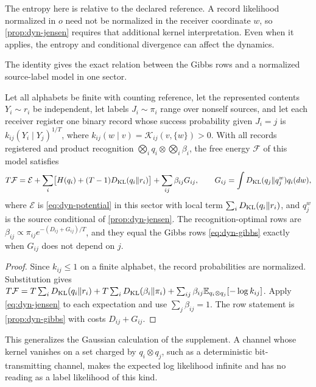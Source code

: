 The entropy here is relative to the declared reference. A record likelihood normalized in $o$ need not be normalized in the receiver coordinate $w$, so \cref{prop:dyn-jensen} requires that additional kernel interpretation. Even when it applies, the entropy and conditional divergence can affect the dynamics.

The identity gives the exact relation between the Gibbs rows and a normalized source-label model in one sector.

Let all alphabets be finite with counting reference, let the represented contents $Y_i\sim r_i$ be independent, let labels $J_i\sim\pi_i$ range over nonself sources, and let each receiver register one binary record whose success probability given $J_i=j$ is $k_{ij}(Y_i\mid Y_j)^{1/T}$, where $k_{ij}(w\mid v)=\mathcal K_{ij}(v,\{w\})>0$. With all records registered and product recognition $\bigotimes_iq_i\otimes\bigotimes_i\beta_i$, the free energy $\mathcal F$ of this model satisfies
\begin{equation}
 T\mathcal F
 =\mathcal E
 +\sum_i\bigl[H(q_i)+(T-1)D_{\mathrm{KL}}(q_i\Vert r_i)\bigr]
 +\sum_{ij}\beta_{ij}G_{ij},
 \qquad
 G_{ij}=\int D_{\mathrm{KL}}(q_j\Vert q_j^w)q_i(dw),
 \label{eq:dyn-label-model}
\end{equation}
where $\mathcal E$ is \cref{eq:dyn-potential} in this sector with local term $\sum_iD_{\mathrm{KL}}(q_i\Vert r_i)$, and $q_j^w$ is the source conditional of \cref{prop:dyn-jensen}. The recognition-optimal rows are $\beta_{ij}\propto\pi_{ij}e^{-(D_{ij}+G_{ij})/T}$, and they equal the Gibbs rows \cref{eq:dyn-gibbs} exactly when $G_{ij}$ does not depend on $j$.
\begin{proof}
Since $k_{ij}\leq1$ on a finite alphabet, the record probabilities are normalized. Substitution gives $T\mathcal F=T\sum_iD_{\mathrm{KL}}(q_i\Vert r_i)+T\sum_iD_{\mathrm{KL}}(\beta_i\Vert\pi_i)+\sum_{ij}\beta_{ij}\mathbb E_{q_i\otimes q_j}[-\log k_{ij}]$. Apply \cref{eq:dyn-jensen} to each expectation and use $\sum_j\beta_{ij}=1$. The row statement is \cref{prop:dyn-gibbs} with costs $D_{ij}+G_{ij}$.
\end{proof}

This generalizes the Gaussian calculation of the supplement. A channel whose kernel vanishes on a set charged by $q_i\otimes q_j$, such as a deterministic bit-transmitting channel, makes the expected log likelihood infinite and has no reading as a label likelihood of this kind.

